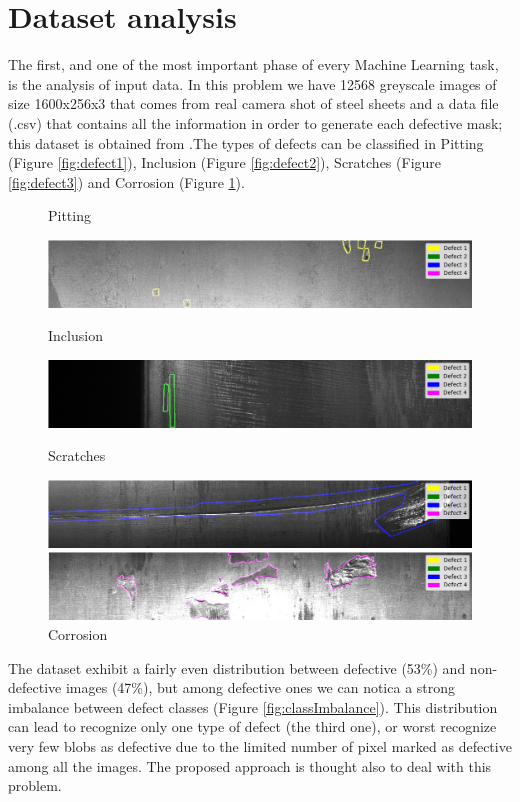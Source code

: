 \documentclass[10pt,twocolumn,letterpaper]{article}
\begin{document}
\graphicspath{ {./Resources/} }
\section{Dataset analysis}
   The first, and one of the most important phase of every Machine Learning task, is the analysis of input data. In this problem we have 12568 greyscale images of size 1600x256x3 that comes from real camera shot of steel sheets and a data file (.csv) that contains all the information in order to generate each defective mask; this dataset is obtained from \cite{Severstal}.The types of defects can be classified in Pitting (Figure \ref{fig:defect1}), Inclusion (Figure \ref{fig:defect2}), Scratches (Figure \ref{fig:defect3}) and Corrosion (Figure \ref{fig:defect4}).

   \begin{figure}[t]
      \centering
      \caption{Pitting} \label{fig:defect1}
      \includegraphics[scale=0.25]{Img_Defect1}
      \caption{Inclusion} \label{fig:defect2}
      \includegraphics[scale=0.25]{Img_Defect2}
      \caption{Scratches} \label{fig:defect3}
      \includegraphics[scale=0.25]{Img_Defect3}
      \caption{Corrosion} \label{fig:defect4}
      \includegraphics[scale=0.25]{Img_Defect4}
   \end{figure}

   The dataset exhibit a fairly even distribution between defective (53\%) and non-defective images (47\%), but among defective ones we can notica a strong imbalance between defect classes (Figure \ref{fig:classImbalance}). This distribution can lead to recognize only one type of defect (the third one), or worst recognize very few blobs as defective due to the limited number of pixel marked as defective among all the images.
   The proposed approach is thought also to deal with this problem.
\end{document}

